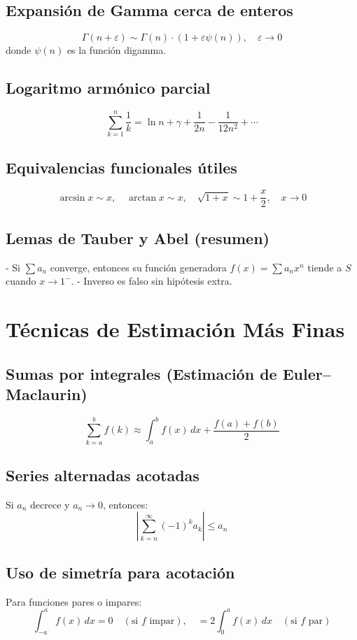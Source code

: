 \documentclass[12pt]{article}
\begin{document}
\subsection{Expansión de Gamma cerca de enteros}
\[
\Gamma(n + \varepsilon) \sim \Gamma(n) \cdot \left(1 + \varepsilon \psi(n) \right),\quad \varepsilon \to 0
\]
donde \(\psi(n)\) es la función digamma.

\subsection{Logaritmo armónico parcial}
\[
\sum_{k=1}^n \frac{1}{k} = \ln n + \gamma + \frac{1}{2n} - \frac{1}{12n^2} + \cdots
\]

\subsection{Equivalencias funcionales útiles}
\[
\arcsin x \sim x,\quad \arctan x \sim x,\quad \sqrt{1 + x} \sim 1 + \frac{x}{2},\quad x \to 0
\]

\subsection{Lemas de Tauber y Abel (resumen)}
- Si \(\sum a_n\) converge, entonces su función generadora \(f(x) = \sum a_n x^n\) tiende a \(S\) cuando \(x \to 1^{-}\).
- Inverso es falso sin hipótesis extra.

\section{Técnicas de Estimación Más Finas}

\subsection{Sumas por integrales (Estimación de Euler–Maclaurin)}
\[
\sum_{k=a}^b f(k) \approx \int_a^b f(x)\,dx + \frac{f(a) + f(b)}{2}
\]

\subsection{Series alternadas acotadas}
Si \(a_n\) decrece y \(a_n \to 0\), entonces:
\[
\left| \sum_{k=n}^\infty (-1)^k a_k \right| \leq a_n
\]

\subsection{Uso de simetría para acotación}
Para funciones pares o impares:
\[
\int_{-a}^a f(x)\,dx = 0 \quad (\text{si } f \text{ impar}),\quad = 2 \int_0^a f(x)\,dx \quad (\text{si } f \text{ par})
\]
\end{document}
